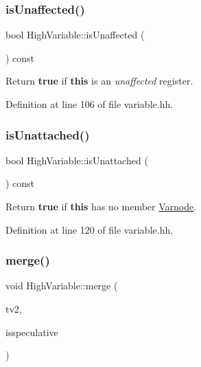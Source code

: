 \subsubsection{\texorpdfstring{isUnaffected()}{isUnaffected()}}
{\footnotesize\ttfamily bool High\+Variable\+::is\+Unaffected (\begin{DoxyParamCaption}\item[{void}]{ }\end{DoxyParamCaption}) const\hspace{0.3cm}{\ttfamily [inline]}}



Return {\bfseries{true}} if {\bfseries{this}} is an {\itshape unaffected} register. 



Definition at line 106 of file variable.\+hh.

\mbox{\label{class_high_variable_a55040c38f214b8352da5c735cb55c492}} 
\subsubsection{\texorpdfstring{isUnattached()}{isUnattached()}}
{\footnotesize\ttfamily bool High\+Variable\+::is\+Unattached (\begin{DoxyParamCaption}\item[{void}]{ }\end{DoxyParamCaption}) const\hspace{0.3cm}{\ttfamily [inline]}}



Return {\bfseries{true}} if {\bfseries{this}} has no member \mbox{\hyperlink{class_varnode}{Varnode}}. 



Definition at line 120 of file variable.\+hh.

\mbox{\label{class_high_variable_a891fb98039d17be9ad7b5b618300fef2}} 
\subsubsection{\texorpdfstring{merge()}{merge()}}
{\footnotesize\ttfamily void High\+Variable\+::merge (\begin{DoxyParamCaption}\item[{\mbox{\hyperlink{class_high_variable}{High\+Variable}} $\ast$}]{tv2,  }\item[{bool}]{isspeculative }\end{DoxyParamCaption})}



